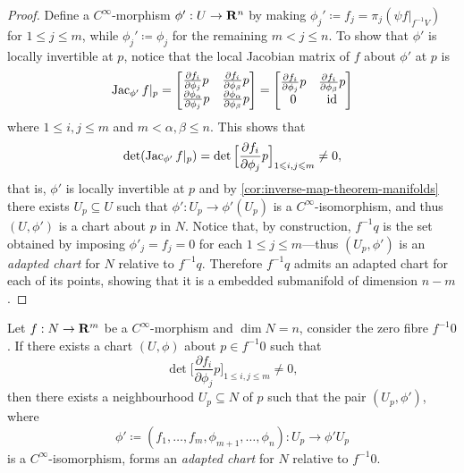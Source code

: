 \begin{proof}
Define a \(C^{\infty}\)-morphism \(\phi': U \to \mathbf{R}^n\) by making
\(\phi_j' \coloneq f_j = \pi_j (\psi f|_{f^{-1} V})\) for \(1 \leq j \leq m\),
while \(\phi_j' \coloneq \phi_j\) for the remaining \(m < j \leq n\). To show
that \(\phi'\) is locally invertible at \(p\), notice that the local Jacobian
matrix of \(f\) about \(\phi'\) at \(p\) is
\[
\operatorname{Jac}_{\phi'} f|_p =
\begin{bmatrix}
  \frac{\partial f_i}{\partial \phi_j} p
  &\frac{\partial f_{i}}{\partial \phi_{\beta}} p
    \\
  \frac{\partial \phi_{\alpha}}{\partial \phi_j} p
  &\frac{\partial \phi_{\alpha}}{\partial \phi_{\beta}} p
\end{bmatrix}
=
\begin{bmatrix}
  \frac{\partial f_i}{\partial \phi_j} p
  &\frac{\partial f_{i}}{\partial \phi_{\beta}} p
    \\
  0
  &\operatorname{id}
\end{bmatrix}
\]
where \(1 \leq i, j \leq m\) and \(m < \alpha, \beta \leq n\). This shows that
\[
\det(\operatorname{Jac}_{\phi'} f|_p)
= \det \Big[ \frac{\partial f_{i}}{\partial \phi_j} p \Big]_{1 \leqslant i, j \leqslant m}
\neq 0,
\]
that is, \(\phi'\) is locally invertible at \(p\) and by
\cref{cor:inverse-map-theorem-manifolds} there exists \(U_p \subseteq U\) such
that \(\phi': U_p \to \phi'(U_p)\) is a \(C^{\infty}\)-isomorphism, and thus
\((U, \phi')\) is a chart about \(p\) in \(N\). Notice that, by construction,
\(f^{-1} q\) is the set obtained by imposing \(\phi'_j = f_j = 0\) for each
\(1 \leq j \leq m\)---thus \((U_p, \phi')\) is an \emph{adapted chart} for \(N\)
relative to \(f^{-1} q\). Therefore \(f^{-1} q\) admits an adapted chart for
each of its points, showing that it is a embedded submanifold of dimension
\(n - m\).
\end{proof}

\begin{corollary}
\label{cor:regular-fibre-producing-adapted-charts}
Let \(f: N \to \mathbf{R}^m\) be a \(C^{\infty}\)-morphism and \(\dim N = n\), consider
the zero fibre \(f^{-1} 0\). If there exists a chart \((U, \phi)\) about
\(p \in f^{-1} 0\) such that
\[
\det \Big[ \frac{\partial f_i}{\partial \phi_j} p \Big]_{1 \leq i, j \leq m}
\neq 0,
\]
then there exists a neighbourhood \(U_p \subseteq N\) of \(p\) such that the
pair \((U_p, \phi')\), where
\[
\phi' \coloneq (f_1, \dots, f_m, \phi_{m+1}, \dots, \phi_n):
U_p \longrightarrow \phi' U_p
\]
is a \(C^{\infty}\)-isomorphism, forms an \emph{adapted chart} for \(N\)
relative to \(f^{-1} 0\).
\end{corollary}

